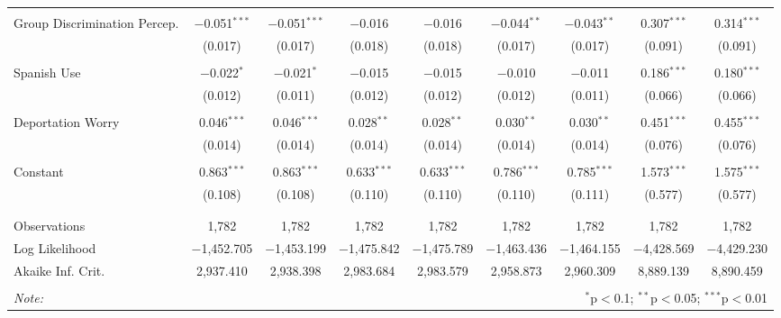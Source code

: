 \begin{table}[!htbp]
\begin{tabular}{@{\extracolsep{5pt}}lcccccccc}
  & & & & & & & & \\ 
 Group Discrimination Percep. & $-$0.051$^{***}$ & $-$0.051$^{***}$ & $-$0.016 & $-$0.016 & $-$0.044$^{**}$ & $-$0.043$^{**}$ & 0.307$^{***}$ & 0.314$^{***}$ \\ 
  & (0.017) & (0.017) & (0.018) & (0.018) & (0.017) & (0.017) & (0.091) & (0.091) \\ 
  & & & & & & & & \\ 
 Spanish Use & $-$0.022$^{*}$ & $-$0.021$^{*}$ & $-$0.015 & $-$0.015 & $-$0.010 & $-$0.011 & 0.186$^{***}$ & 0.180$^{***}$ \\ 
  & (0.012) & (0.011) & (0.012) & (0.012) & (0.012) & (0.011) & (0.066) & (0.066) \\ 
  & & & & & & & & \\ 
 Deportation Worry & 0.046$^{***}$ & 0.046$^{***}$ & 0.028$^{**}$ & 0.028$^{**}$ & 0.030$^{**}$ & 0.030$^{**}$ & 0.451$^{***}$ & 0.455$^{***}$ \\ 
  & (0.014) & (0.014) & (0.014) & (0.014) & (0.014) & (0.014) & (0.076) & (0.076) \\ 
  & & & & & & & & \\ 
 Constant & 0.863$^{***}$ & 0.863$^{***}$ & 0.633$^{***}$ & 0.633$^{***}$ & 0.786$^{***}$ & 0.785$^{***}$ & 1.573$^{***}$ & 1.575$^{***}$ \\ 
  & (0.108) & (0.108) & (0.110) & (0.110) & (0.110) & (0.111) & (0.577) & (0.577) \\ 
  & & & & & & & & \\ 
\hline \\[-1.8ex] 
Observations & 1,782 & 1,782 & 1,782 & 1,782 & 1,782 & 1,782 & 1,782 & 1,782 \\ 
Log Likelihood & $-$1,452.705 & $-$1,453.199 & $-$1,475.842 & $-$1,475.789 & $-$1,463.436 & $-$1,464.155 & $-$4,428.569 & $-$4,429.230 \\ 
Akaike Inf. Crit. & 2,937.410 & 2,938.398 & 2,983.684 & 2,983.579 & 2,958.873 & 2,960.309 & 8,889.139 & 8,890.459 \\ 
\hline 
\hline \\[-1.8ex] 
\textit{Note:}  & \multicolumn{8}{r}{$^{*}$p$<$0.1; $^{**}$p$<$0.05; $^{***}$p$<$0.01} \\ 
\end{tabular} 
\end{table} 
